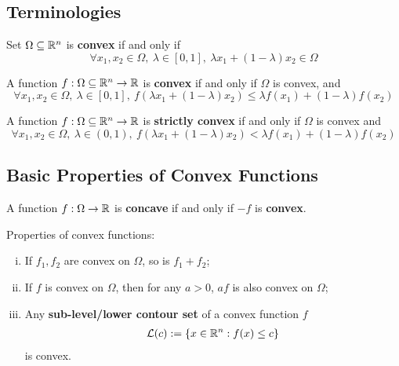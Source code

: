 \documentclass{article}
\begin{document}
    \subsection{Terminologies}
    \begin{definition}
        Set $\Omega \subseteq \mathbb{R}^n$ is \textbf{convex} if and only if 
        \begin{equation}
            \forall x_1, x_2 \in \Omega,\ \lambda \in [0, 1],\ \lambda x_1 + (1 - \lambda) x_2 \in \Omega
        \end{equation}
    \end{definition}
    
    \begin{definition}
        A function $f: \Omega \subseteq \mathbb{R}^n \to \mathbb{R}$ is \textbf{convex} if and only if $\Omega$ is convex, and 
        \begin{equation}
            \forall x_1, x_2 \in \Omega,\ \lambda \in [0, 1],\ f\left(\lambda x_1 + (1- \lambda) x_2 \right) \leq \lambda f(x_1) + (1 - \lambda) f(x_2)
        \end{equation}
    \end{definition}
    
    \begin{definition}
        A function $f: \Omega \subseteq \mathbb{R}^n \to \mathbb{R}$ is \textbf{strictly convex} if and only if $\Omega$ is convex and 
        \begin{equation}
            \forall x_1, x_2 \in \Omega,\ \lambda \in (0, 1),\ f\left(\lambda x_1 + (1- \lambda) x_2 \right) < \lambda f(x_1) + (1 - \lambda) f(x_2)
        \end{equation}
    \end{definition}
    
    \subsection{Basic Properties of Convex Functions}
    
    \begin{definition}
        A function $f: \Omega \to \mathbb{R}$ is \textbf{concave} if and only if $-f$ is \textbf{convex}.
    \end{definition}
    
    \begin{proposition} Properties of convex functions:
        \begin{enumerate}[(i)]
            \item If $f_1, f_2$ are convex on $\Omega$, so is $f_1 + f_2$;
            \item If $f$ is convex on $\Omega$, then for any $a > 0$, $af$ is also convex on $\Omega$;
            \item Any \textbf{sub-level/lower contour set} of a convex function $f$ 
            \begin{align}
            	\mathcal{{L}}(c) := \{x \in \mathbb{R}^n: f(x) \leq c\}
            \end{align}
            is convex.
        \end{enumerate}
    \end{proposition}
    
\end{document}
